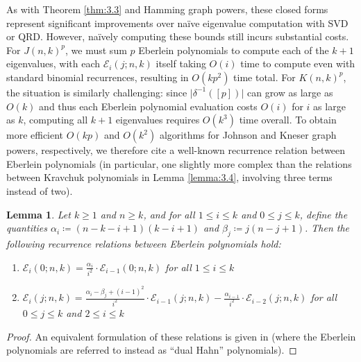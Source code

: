 \documentclass{article}
\def\Ein{\mathcal{E}}
\numberwithin{equation}{section}
\theoremstyle{plain}
\newtheorem{lemma}[theorem]{Lemma}
\begin{document}
As with Theorem \ref{thm:3.3} and Hamming graph powers, these closed forms represent significant improvements over na\"ive eigenvalue computation with SVD or QRD. However, na\"ively computing these bounds still incurs substantial costs. For $J(n, k)^p$, we must sum $p$ Eberlein polynomials to compute each of the $k + 1$ eigenvalues, with each $\Ein_i(j; n, k)$ itself taking $O(i)$ time to compute even with standard binomial recurrences, resulting in $O(kp^2)$ time total. For $K(n, k)^p$, the situation is similarly challenging: since $\bigl\lvert \delta^{-1}([p]) \bigr\rvert$ can grow as large as $O(k)$ and thus each Eberlein polynomial evaluation costs $O(i)$ for $i$ as large as $k$, computing all $k + 1$ eigenvalues requires $O(k^3)$ time overall. To obtain more efficient $O(kp)$ and $O(k^2)$ algorithms for Johnson and Kneser graph powers, respectively, we therefore cite a well-known recurrence relation between Eberlein polynomials (in particular, one slightly more complex than the relations between Kravchuk polynomials in Lemma \ref{lemma:3.4}, involving three terms instead of two).

\begin{lemma}\label{lemma:4.6}
    Let $k \ge 1$ and $n \ge k$, and for all $1 \le i \le k$ and $0 \le j \le k$, define the quantities $\alpha_i \coloneqq (n - k - i + 1)(k - i + 1)$ and $\beta_j \coloneqq j(n - j + 1)$. Then the following recurrence relations between Eberlein polynomials hold:
    \begin{enumerate}[label=(\roman*)]
        \item $\displaystyle \Ein_i(0; n, k) = \frac{\alpha_i}{i^2} \cdot \Ein_{i - 1}(0; n, k)$ for all $1 \le i \le k$
        \item $\displaystyle \Ein_i(j; n, k) = \frac{\alpha_i - \beta_j + (i - 1)^2}{i^2} \cdot \Ein_{i - 1}(j; n, k) - \frac{\alpha_{i - 1}}{i^2} \cdot \Ein_{i - 2}(j; n, k)$ for all $0 \le j \le k$ and $2 \le i \le k$
    \end{enumerate}
\end{lemma}

\begin{proof}
    An equivalent formulation of these relations is given in \cite[p. 35]{KS98} (where the Eberlein polynomials are referred to instead as ``dual Hahn'' polynomials).
\end{proof}
\end{document}
